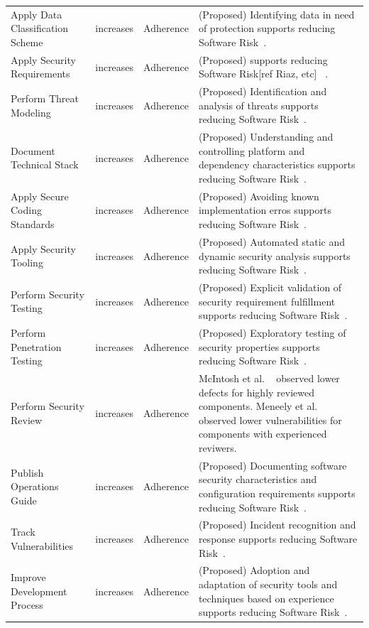 \begin{table}[!htbp]
\begin{small}
\begin{tabular}{@{\extracolsep{5pt}}p{4cm}p{1cm}p{2cm}p{8cm}}
			Apply Data Classification Scheme & increases & 	Adherence & (Proposed) Identifying data in need of protection supports reducing Software Risk~\cite{morrison2017surveying}.\\	
			Apply Security Requirements	&	increases	&	Adherence & (Proposed)  supports reducing Software Risk[ref Riaz, etc] ~\cite{morrison2017surveying}.\\
			Perform Threat Modeling &	increases &	Adherence &(Proposed) Identification and analysis of threats supports reducing Software Risk~\cite{morrison2017surveying}. \\	
			Document Technical Stack &	increases &	Adherence & (Proposed) Understanding and controlling platform and dependency characteristics supports reducing Software Risk~\cite{morrison2017surveying}.\\	
			Apply Secure Coding Standards &	increases	& Adherence & (Proposed)  Avoiding known implementation erros supports reducing Software Risk~\cite{morrison2017surveying}.\\
			Apply Security Tooling &	increases &	Adherence & (Proposed)  Automated static and dynamic security analysis supports reducing Software Risk~\cite{morrison2017surveying}.\\
			Perform Security Testing &	increases &	Adherence & (Proposed)  Explicit validation of security requirement fulfillment supports reducing Software Risk~\cite{morrison2017surveying}.\\	
			Perform Penetration Testing &	increases &	Adherence	& (Proposed)  Exploratory testing of security properties supports reducing Software Risk~\cite{morrison2017surveying}.\\
			Perform Security Review &	increases &	Adherence	&  McIntosh et al. ~\cite{mcintosh2014the} observed lower defects for highly reviewed components. Meneely et al. ~\cite{meneely2014empirical} observed lower vulnerabilities for components with experienced reviwers. \\
			Publish Operations Guide &	increases	& Adherence & (Proposed) Documenting software security characteristics and configuration requirements supports reducing Software Risk~\cite{morrison2017surveying}.\\
			Track Vulnerabilities &	increases &	Adherence & (Proposed) Incident recognition and response supports reducing Software Risk~\cite{morrison2017surveying}.\\	
			Improve Development Process &	increases &	Adherence & (Proposed)  Adoption and adaptation of security tools and techniques based on experience supports reducing Software Risk~\cite{morrison2017surveying}.\\	

\end{tabular}
\end{small}
\end{table}
